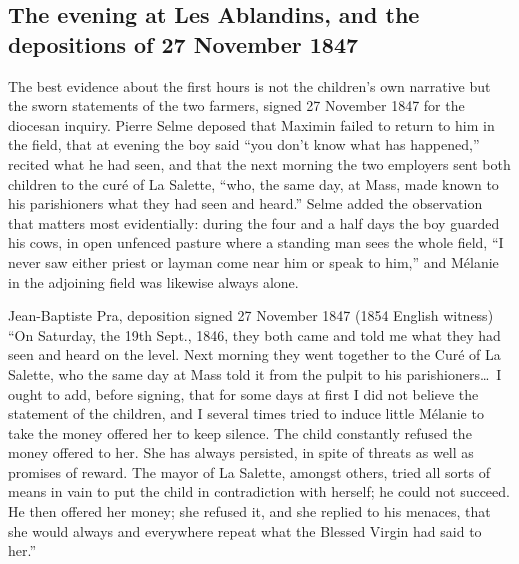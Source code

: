 \subsection{The evening at Les Ablandins, and the depositions of 27
November 1847}

The best evidence about the first hours is not the children's own
narrative but the sworn statements of the two farmers, signed 27
November 1847 for the diocesan inquiry. Pierre Selme deposed that
Maximin failed to return to him in the field, that at evening the
boy said ``you don't know what has happened,'' recited what he had
seen, and that the next morning the two employers sent both children
to the curé of La Salette, ``who, the same day, at Mass, made known
to his parishioners what they had seen and heard.'' Selme added the
observation that matters most evidentially: during the four and a
half days the boy guarded his cows, in open unfenced pasture where a
standing man sees the whole field, ``I never saw either priest or
layman come near him or speak to him,'' and Mélanie in the adjoining
field was likewise always alone.

\begin{witnesstext}{Jean-Baptiste Pra, deposition signed 27 November
1847 (1854 English witness)}
``On Saturday, the 19th Sept., 1846, they both came and told me what
they had seen and heard on the level. Next morning they went
together to the Curé of La Salette, who the same day at Mass told it
from the pulpit to his parishioners\ldots\ I ought to add, before
signing, that for some days at first I did not believe the statement
of the children, and I several times tried to induce little Mélanie
to take the money offered her to keep silence. The child constantly
refused the money offered to her. She has always persisted, in spite
of threats as well as promises of reward. The mayor of La Salette,
amongst others, tried all sorts of means in vain to put the child in
contradiction with herself; he could not succeed. He then offered
her money; she refused it, and she replied to his menaces, that she
would always and everywhere repeat what the Blessed Virgin had said
to her.''
\end{witnesstext}

